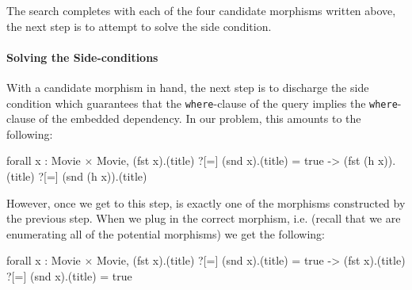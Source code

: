 \documentclass[preprint]{sigplanconf}
\newcommand{\ltac}[0]{\ensuremath{\mathcal{L}_{\mathrm{tac}}}}
\begin{document}

The search completes with each of the four candidate morphisms written above, the next step is to attempt to solve the side condition.

\paragraph{Solving the Side-conditions}
With a candidate morphism in hand, the next step is to discharge the side condition which guarantees that the {\tt where}-clause of the query implies the {\tt where}-clause of the embedded dependency.
In our problem, this amounts to the following:
\begin{coq}
forall x : Movie $\times$ Movie, (fst x).(title) ?[=] (snd x).(title) = true
     -> (fst (h x)).(title) ?[=] (snd (h x)).(title)
\end{coq}
However, once we get to this step,  is exactly one of the morphisms constructed by the previous step.
When we plug in the correct morphism, i.e.  (recall that we are enumerating all of the potential morphisms) we get the following:
\begin{coq}
forall x : Movie $\times$ Movie, (fst x).(title) ?[=] (snd x).(title) = true
     -> (fst x).(title) ?[=] (snd x).(title) = true
\end{coq}
\end{document}
